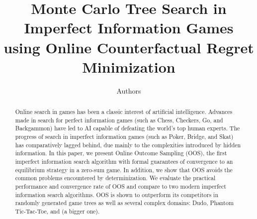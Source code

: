 \documentclass[letterpaper]{article}
\begin{document}
%
\title{Monte Carlo Tree Search in Imperfect Information Games\\using Online Counterfactual Regret Minimization}
\author{Authors}

\newcommand{\vlnote}[1]{{\scriptsize \color{blue} $\blacksquare$ \refstepcounter{vlNoteCounter}\textsf{[VL]$_{\arabic{vlNoteCounter}}$:{#1}}}}
\newcommand{\mlnote}[1]{{\scriptsize \color{darkgreen} $\blacksquare$ \refstepcounter{mlNoteCounter}\textsf{[ML]$_{\arabic{mlNoteCounter}}$:{#1}}}}
\newcommand{\asnote}[1]{{\scriptsize \color{red} $\blacktriangle$ \refstepcounter{asNoteCounter}\textsf{[AS]$_{\arabic{asNoteCounter}}$:{#1}}}}


\maketitle

\begin{abstract}
Online search in games has been a classic interest of artificial intelligence.
Advances made in search for perfect information games (such as Chess, Checkers, Go, and Backgammon) have led to AI capable of defeating the world's top human experts. 
The progress of search in imperfect information games (such as Poker, Bridge, and Skat) has comparatively lagged behind, due mainly to the complexities introduced by hidden information. 
In this paper, we present Online Outcome Sampling (OOS), the first imperfect information search algorithm with formal guarantees of convergence to an equilibrium strategy in a zero-sum game.   
In addition, we show that OOS avoids the common problems encountered by determinization.
We evaluate the practical performance and convergence rate of OOS and compare to two modern imperfect information search algorithms.
OOS is shown to outperform its competitors in randomly generated game trees as well as several complex domains: 
Dudo, Phantom Tic-Tac-Toe, and (a bigger one). 
\end{abstract}
\end{document}
